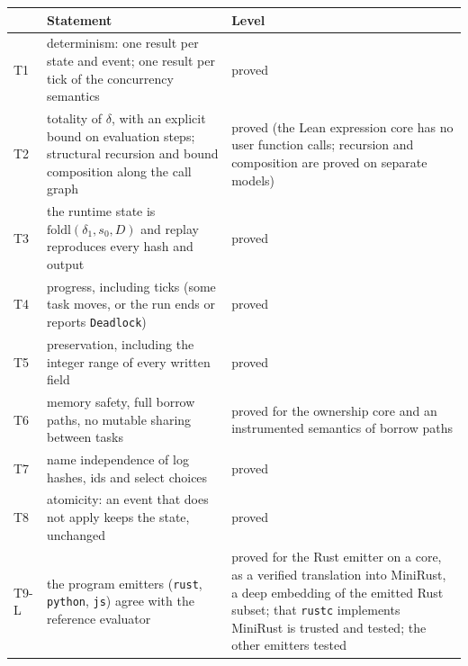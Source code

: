 \documentclass[10pt,letterpaper]{article}
\newcounter{none}
\begin{document}
{\def\LTcaptype{none} %
{\footnotesize\setlength{\tabcolsep}{3.8pt}\renewcommand{\arraystretch}{1.15}
\begin{longtable}[]{@{}
  >{\raggedright\arraybackslash}p{}
  >{\raggedright\arraybackslash}p{}
  >{\raggedright\arraybackslash}p{}@{}}
\toprule\noalign{}
\begin{minipage}[b]{\linewidth}\raggedright
\end{minipage} & \begin{minipage}[b]{\linewidth}\raggedright
\textbf{Statement}
\end{minipage} & \begin{minipage}[b]{\linewidth}\raggedright
\textbf{Level}
\end{minipage} \\
\midrule\noalign{}
\endhead
\bottomrule\noalign{}
\endlastfoot
T1 & determinism: one result per state and event; one result per tick of
the concurrency semantics & proved \\
T2 & totality of \(\delta\), with an explicit bound on evaluation steps;
structural recursion and bound composition along the call graph & proved
(the Lean expression core has no user function calls; recursion and
composition are proved on separate models) \\
T3 & the runtime state is \(\mathrm{foldl}(\delta_1, s_0, D)\) and
replay reproduces every hash and output & proved \\
T4 & progress, including ticks (some task moves, or the run ends or
reports \texttt{Deadlock}) & proved \\
T5 & preservation, including the integer range of every written field &
proved \\
T6 & memory safety, full borrow paths, no mutable sharing between tasks
& proved for the ownership core and an instrumented semantics of borrow
paths \\
T7 & name independence of log hashes, ids and select choices & proved \\
T8 & atomicity: an event that does not apply keeps the state, unchanged
& proved \\
T9-L & the program emitters (\texttt{rust}, \texttt{python},
\texttt{js}) agree with the reference evaluator & proved for the Rust
emitter on a core, as a verified translation into MiniRust, a deep
embedding of the emitted Rust subset; that \texttt{rustc} implements
MiniRust is trusted and tested; the other emitters tested \\

\end{longtable}}}
\end{document}
